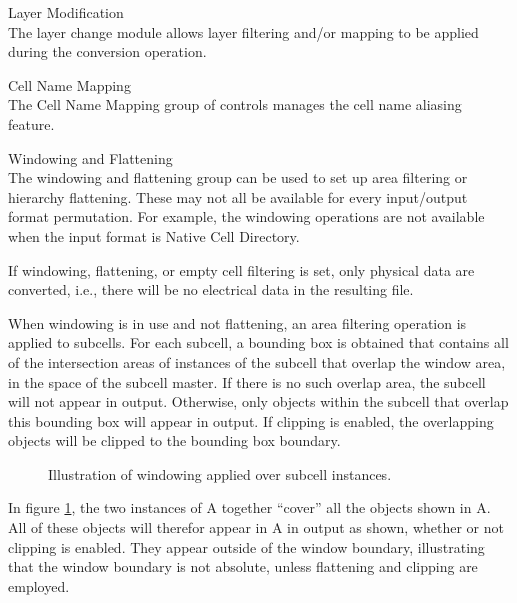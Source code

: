 \begin{description}
\item{\cb Layer Modification}\\
The layer change module allows layer filtering and/or mapping to be
applied during the conversion operation.

\item{\cb Cell Name Mapping}\\
The {\cb Cell Name Mapping} group of controls manages the cell
name aliasing feature.

\item{\cb Windowing and Flattening}\\
The windowing and flattening group can be used to set up area
filtering or hierarchy flattening.  These may not all be available for
every input/output format permutation.  For example, the windowing
operations are not available when the input format is {\cb Native Cell
Directory}.

If windowing, flattening, or empty cell filtering is set, only
physical data are converted, i.e., there will be no electrical data in
the resulting file.

When windowing is in use and not flattening, an area filtering
operation is applied to subcells.  For each subcell, a bounding box is
obtained that contains all of the intersection areas of instances of
the subcell that overlap the window area, in the space of the subcell
master.  If there is no such overlap area, the subcell will not appear
in output.  Otherwise, only objects within the subcell that overlap
this bounding box will appear in output.  If clipping is enabled, the
overlapping objects will be clipped to the bounding box boundary.

\begin{figure}
\caption{\label{writeregion} Illustration of windowing applied over
subcell instances.}
\vspace{1.5ex}
\begin{center}
\end{center}
\end{figure}

In figure \ref{writeregion}, the two instances of A together ``cover''
all the objects shown in A.  All of these objects will therefor appear
in A in output as shown, whether or not clipping is enabled.  They
appear outside of the window boundary, illustrating that the window
boundary is not absolute, unless flattening and clipping are employed.


\end{description}
